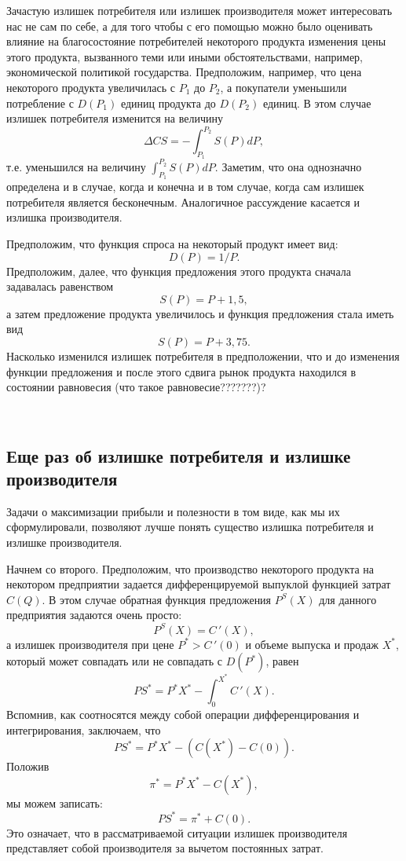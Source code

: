         Зачастую излишек потребителя или излишек производителя может
        интересовать нас не сам по себе, а для того чтобы с его помощью
         можно было оценивать влияние на благосостояние потребителей
         некоторого продукта изменения цены этого продукта, вызванного
          теми или иными обстоятельствами, например, экономической
          политикой государства. Предположим, например, что цена
          некоторого продукта увеличилась с $P_{1}$ до $P_{2}$, а
          покупатели уменьшили потребление с $D(P_{1})$ единиц
    продукта до $D(P_{2})$ единиц. В этом случае излишек потребителя изменится на величину
     \[\Delta CS=-\int_{P_{1}}^{P_{2}}S(P)dP ,\]
      т.е. уменьшился на величину $\int_{P_{1}}^{P_{2}}S(P)dP$.
    Заметим, что она однозначно определена и в случае, когда и
    конечна и в том случае, когда сам излишек потребителя является
    бесконечным. Аналогичное рассуждение касается и излишка
    производителя.

\begin{exer}
    Предположим, что функция спроса на некоторый продукт имеет вид:
    \[D(P)=1/P.\]
    Предположим, далее, что функция предложения этого продукта сначала
    задавалась равенством
    \[S(P)=P+1,5,\]
    а затем предложение продукта увеличилось и функция предложения стала
    иметь вид
    \[S(P)=P+3,75.\]
    Насколько изменился излишек потребителя в предположении, что и до
    изменения функции предложения и после этого сдвига рынок продукта
    находился в состоянии равновесия (что такое равновесие???????)?
\end{exer}



\


\subsection{Еще раз об излишке потребителя и излишке производителя}

    Задачи о максимизации прибыли и полезности в том виде, как мы их
    сформулировали, позволяют лучше понять существо излишка
    потребителя и излишке производителя.

    Начнем со второго. Предположим, что производство некоторого
    продукта на некотором предприятии задается дифференцируемой
    выпуклой функцией затрат $C(Q)$. В этом случае обратная функция
    предложения $P^{S}(X)$ для данного предприятия
    задаются очень просто:
    \[P^{S}(X)=C\,'(X), \]
    а излишек производителя  при цене $P^{*}>C\,'(0)$ и объеме выпуска и продаж
    $X^{*}$, который может совпадать или не совпадать с $D(P^{*})$, равен
    \[PS^{*}=P^{*}X^{*}-\int_{0}^{X^{*}}C\,'(X).\]
    Вспомнив, как соотносятся между собой операции дифференцирования
    и интегрирования, заключаем, что
    \[PS^{*}=P^{*}X^{*}-(C(X^{*})-C(0)).\]
    Положив
    \[\pi^{*}=P^{*}X^{*}-C(X^{*}),\]
    мы можем записать:
    \[PS^{*}=\pi^{*}+C(0).\]
    Это означает, что в рассматриваемой ситуации излишек
    производителя представляет собой производителя за вычетом постоянных затрат.

